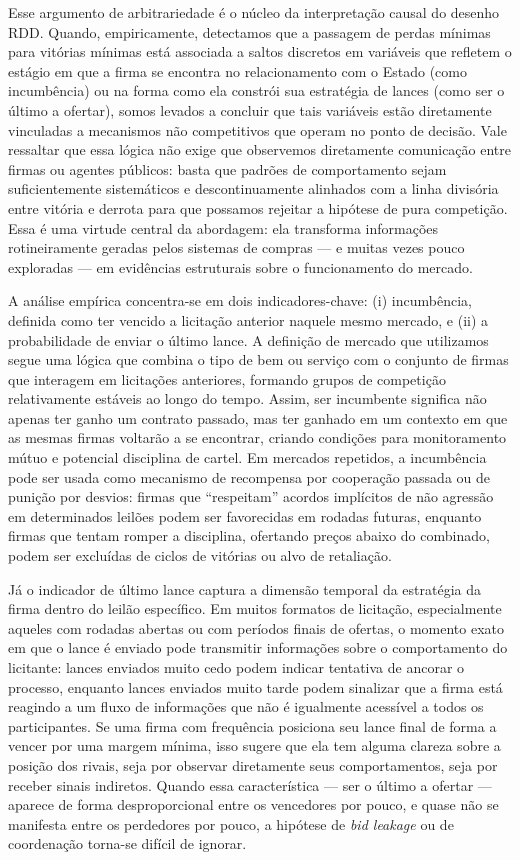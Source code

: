 \documentclass[12pt,a4paper]{article}
\begin{document}
Esse argumento de arbitrariedade é o núcleo da interpretação causal do desenho RDD. Quando, empiricamente, detectamos que a passagem de perdas mínimas para vitórias mínimas está associada a saltos discretos em variáveis que refletem o estágio em que a firma se encontra no relacionamento com o Estado (como incumbência) ou na forma como ela constrói sua estratégia de lances (como ser o último a ofertar), somos levados a concluir que tais variáveis estão diretamente vinculadas a mecanismos não competitivos que operam no ponto de decisão. Vale ressaltar que essa lógica não exige que observemos diretamente comunicação entre firmas ou agentes públicos: basta que padrões de comportamento sejam suficientemente sistemáticos e descontinuamente alinhados com a linha divisória entre vitória e derrota para que possamos rejeitar a hipótese de pura competição. Essa é uma virtude central da abordagem: ela transforma informações rotineiramente geradas pelos sistemas de compras — e muitas vezes pouco exploradas — em evidências estruturais sobre o funcionamento do mercado.

A análise empírica concentra-se em dois indicadores-chave: (i) incumbência, definida como ter vencido a licitação anterior naquele mesmo mercado, e (ii) a probabilidade de enviar o último lance. A definição de mercado que utilizamos segue uma lógica que combina o tipo de bem ou serviço com o conjunto de firmas que interagem em licitações anteriores, formando grupos de competição relativamente estáveis ao longo do tempo. Assim, ser incumbente significa não apenas ter ganho um contrato passado, mas ter ganhado em um contexto em que as mesmas firmas voltarão a se encontrar, criando condições para monitoramento mútuo e potencial disciplina de cartel. Em mercados repetidos, a incumbência pode ser usada como mecanismo de recompensa por cooperação passada ou de punição por desvios: firmas que ``respeitam'' acordos implícitos de não agressão em determinados leilões podem ser favorecidas em rodadas futuras, enquanto firmas que tentam romper a disciplina, ofertando preços abaixo do combinado, podem ser excluídas de ciclos de vitórias ou alvo de retaliação.

Já o indicador de último lance captura a dimensão temporal da estratégia da firma dentro do leilão específico. Em muitos formatos de licitação, especialmente aqueles com rodadas abertas ou com períodos finais de ofertas, o momento exato em que o lance é enviado pode transmitir informações sobre o comportamento do licitante: lances enviados muito cedo podem indicar tentativa de ancorar o processo, enquanto lances enviados muito tarde podem sinalizar que a firma está reagindo a um fluxo de informações que não é igualmente acessível a todos os participantes. Se uma firma com frequência posiciona seu lance final de forma a vencer por uma margem mínima, isso sugere que ela tem alguma clareza sobre a posição dos rivais, seja por observar diretamente seus comportamentos, seja por receber sinais indiretos. Quando essa característica — ser o último a ofertar — aparece de forma desproporcional entre os vencedores por pouco, e quase não se manifesta entre os perdedores por pouco, a hipótese de \textit{bid leakage} ou de coordenação torna-se difícil de ignorar.
\end{document}
